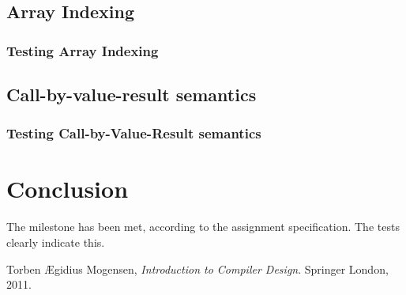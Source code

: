 \documentclass[10pt]{article}
\begin{document}
\subsection{Array Indexing}
\subsubsection{Testing Array Indexing}
\subsection{Call-by-value-result semantics}
\subsubsection{Testing Call-by-Value-Result semantics}

\section{Conclusion}
The milestone has been met, according to the assignment specification. The tests clearly indicate this.

\begin{thebibliography}{9}
Torben Ægidius Mogensen,
\emph{Introduction to Compiler Design}.
Springer London,
2011.

\end{thebibliography}


\end{document}
